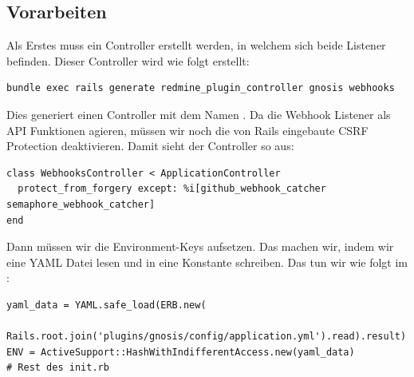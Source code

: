 \subsection{Vorarbeiten}
\label{sec:webhook_prework}
Als Erstes muss ein Controller erstellt werden, in welchem sich beide Listener befinden. Dieser Controller wird wie
folgt erstellt:
\begin{codebox}[]
  \begin{verbatim}
bundle exec rails generate redmine_plugin_controller gnosis webhooks
  \end{verbatim}
\end{codebox}

Dies generiert einen Controller mit dem Namen . Da die Webhook Listener als
API Funktionen agieren, müssen wir noch die von Rails eingebaute CSRF Protection deaktivieren. Damit sieht der
Controller so aus:
\begin{codebox}[]
  \begin{verbatim}
class WebhooksController < ApplicationController
  protect_from_forgery except: %i[github_webhook_catcher semaphore_webhook_catcher]
end
  \end{verbatim}
\end{codebox}

Dann müssen wir die Environment-Keys aufsetzen. Das machen wir, indem wir eine YAML Datei lesen und in eine Konstante
schreiben. Das tun wir wie folgt im :
\begin{codebox}[]
  \begin{verbatim}
yaml_data = YAML.safe_load(ERB.new(
  Rails.root.join('plugins/gnosis/config/application.yml').read).result)
ENV = ActiveSupport::HashWithIndifferentAccess.new(yaml_data)
# Rest des init.rb
  \end{verbatim}
\end{codebox}

